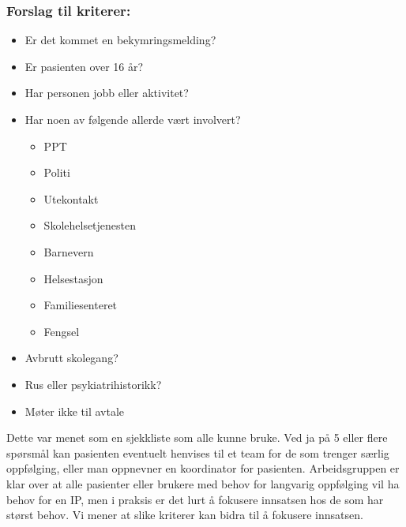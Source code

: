 \documentclass[11pt]{report} %
\begin{document}
                    \subsubsection{Forslag til kriterer:}
                      \begin{itemize}
                        \item Er det kommet en bekymringsmelding?\\
                        \item Er pasienten over 16 år?\\
                        \item Har personen jobb eller aktivitet?\\
                        \item Har noen av følgende allerde vært involvert?
                          \begin{itemize}
                            \item PPT\\
                            \item Politi\\
                            \item Utekontakt\\
                            \item Skolehelsetjenesten\\
                            \item Barnevern\\
                            \item Helsestasjon\\
                            \item Familiesenteret\\
                            \item Fengsel\\
                          \end{itemize}
                        \item Avbrutt skolegang?\\
                        \item Rus eller psykiatrihistorikk?\\
                        \item Møter ikke til avtale\\
                      \end{itemize}
                    Dette var menet som en sjekkliste som alle kunne bruke. Ved ja på 5 eller flere spørsmål kan pasienten eventuelt henvises til et team for de som trenger særlig oppfølging, eller man oppnevner en koordinator for pasienten. Arbeidsgruppen er klar over at alle pasienter eller brukere med behov for langvarig oppfølging vil ha behov for en IP, men i praksis er det lurt å fokusere innsatsen hos de som har størst behov. Vi mener at slike kriterer kan bidra til å fokusere innsatsen.\\
\end{document}
